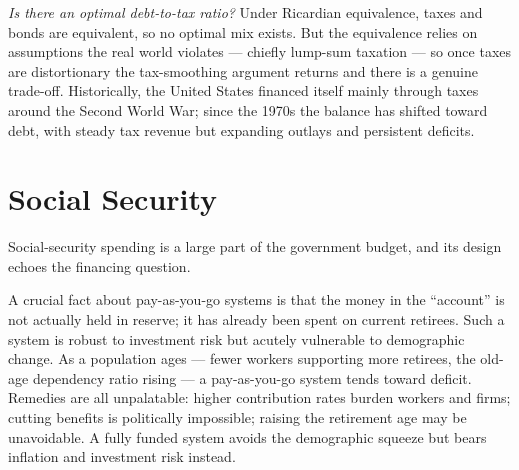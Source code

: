 \emph{Is there an optimal debt-to-tax ratio?} Under Ricardian equivalence, taxes and bonds are equivalent, so no optimal mix exists. But the equivalence relies on assumptions the real world violates --- chiefly lump-sum taxation --- so once taxes are distortionary the tax-smoothing argument returns and there is a genuine trade-off. Historically, the United States financed itself mainly through taxes around the Second World War; since the 1970s the balance has shifted toward debt, with steady tax revenue but expanding outlays and persistent deficits.

\section{Social Security}

Social-security spending is a large part of the government budget, and its design echoes the financing question.


A crucial fact about pay-as-you-go systems is that the money in the ``account'' is not actually held in reserve; it has already been spent on current retirees. Such a system is robust to investment risk but acutely vulnerable to demographic change. As a population ages --- fewer workers supporting more retirees, the old-age dependency ratio rising --- a pay-as-you-go system tends toward deficit. Remedies are all unpalatable: higher contribution rates burden workers and firms; cutting benefits is politically impossible; raising the retirement age may be unavoidable. A fully funded system avoids the demographic squeeze but bears inflation and investment risk instead.
